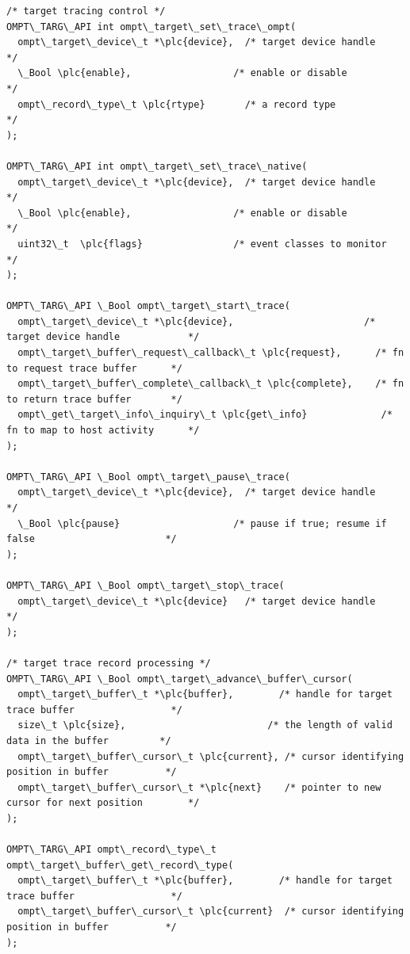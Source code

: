 \documentclass{article}
\begin{document}
\begin{boxedcode}
\begin{verbatim}
/* target tracing control */
OMPT\_TARG\_API int ompt\_target\_set\_trace\_ompt(
  ompt\_target\_device\_t *\plc{device},  /* target device handle                                 */
  \_Bool \plc{enable},                  /* enable or disable                                    */
  ompt\_record\_type\_t \plc{rtype}       /* a record type                                        */
);

OMPT\_TARG\_API int ompt\_target\_set\_trace\_native(
  ompt\_target\_device\_t *\plc{device},  /* target device handle                                 */
  \_Bool \plc{enable},                  /* enable or disable                                    */
  uint32\_t  \plc{flags}                /* event classes to monitor                             */
);

OMPT\_TARG\_API \_Bool ompt\_target\_start\_trace(
  ompt\_target\_device\_t *\plc{device},                       /* target device handle            */
  ompt\_target\_buffer\_request\_callback\_t \plc{request},      /* fn to request trace buffer      */
  ompt\_target\_buffer\_complete\_callback\_t \plc{complete},    /* fn to return trace buffer       */
  ompt\_get\_target\_info\_inquiry\_t \plc{get\_info}             /* fn to map to host activity      */
);

OMPT\_TARG\_API \_Bool ompt\_target\_pause\_trace(
  ompt\_target\_device\_t *\plc{device},  /* target device handle                                 */
  \_Bool \plc{pause}                    /* pause if true; resume if false                       */
);

OMPT\_TARG\_API \_Bool ompt\_target\_stop\_trace(
  ompt\_target\_device\_t *\plc{device}   /* target device handle                                 */
);

/* target trace record processing */
OMPT\_TARG\_API \_Bool ompt\_target\_advance\_buffer\_cursor(
  ompt\_target\_buffer\_t *\plc{buffer},        /* handle for target trace buffer                 */
  size\_t \plc{size},                         /* the length of valid data in the buffer         */
  ompt\_target\_buffer\_cursor\_t \plc{current}, /* cursor identifying position in buffer          */
  ompt\_target\_buffer\_cursor\_t *\plc{next}    /* pointer to new cursor for next position        */
);

OMPT\_TARG\_API ompt\_record\_type\_t ompt\_target\_buffer\_get\_record\_type(
  ompt\_target\_buffer\_t *\plc{buffer},        /* handle for target trace buffer                 */
  ompt\_target\_buffer\_cursor\_t \plc{current}  /* cursor identifying position in buffer          */
);


\end{verbatim}
\end{boxedcode}
\end{document}
